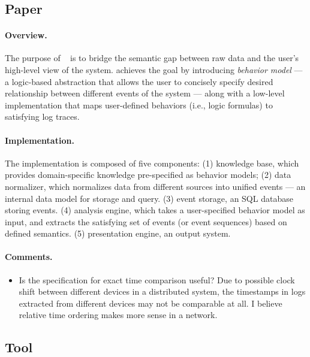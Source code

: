 \documentclass{article}
\begin{document}
\section{\saf{}}
\label{sec:saf}

\subsection{Paper}
\label{sec:safpaper}

\paragraph{Overview.}
The purpose of \saf{}~\cite{arun2011} is to bridge the semantic gap between raw
data and the user's high-level view of the system. \saf{} achieves the goal by
introducing {\em behavior model} --- a logic-based abstraction that allows the user to
concisely specify desired relationship between different events of the system --- along
with a low-level implementation that maps user-defined behaviors (i.e., logic
formulas) to satisfying log traces. 

\paragraph{Implementation.}
The implementation is composed of five components: 
(1) knowledge base, which provides domain-specific knowledge pre-specified as behavior
models; 
(2) data normalizer, which normalizes data from different sources into unified
events --- an internal data model for storage and query.
(3) event storage, an SQL database storing events.
(4) analysis engine, which takes a user-specified behavior model as input, and
extracts the satisfying set of events (or event sequences) based on defined
semantics.
(5) presentation engine, an output system.

\paragraph{Comments.}
\begin{itemize}
\item Is the specification for exact time comparison useful? Due to possible
  clock shift between different devices in a distributed system, the timestamps
  in logs extracted from different devices may not be comparable at all. I
  believe relative time ordering makes more sense in a network.
\end{itemize}


\subsection{\saf{} Tool}
\label{sec:saftool}
\end{document}
